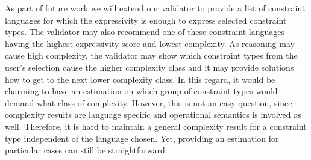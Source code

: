\documentclass{acm_proc_article-sp}
\begin{document}
As part of future work we will extend our validator to provide a list of constraint languages for which the expressivity is enough to express selected constraint types.
The validator may also recommend one of these constraint languages having the highest expressivity score and lowest complexity.
As reasoning may cause high complexity, the validator may show which constraint types from the user's selection cause the higher complexity class 
and it may provide solutions how to get to the next lower complexity class. In this regard, it would be charming to have an estimation on which group of constraint types would demand what class of complexity. However, this is not an easy question, since complexity results are language specific and operational semantics is involved as well. Therefore, it is hard to maintain a general complexity result for a constraint type independent of the language chosen. Yet, providing an estimation for particular cases can still be straightforward.
\end{document}

